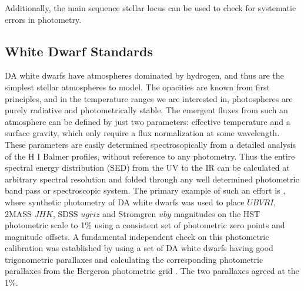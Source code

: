 \documentclass[12pt,preprint]{aastex}
\begin{document}
\noindent
Additionally, the main sequence stellar locus can be used to check for systematic errors in 
photometry.

\subsection{White Dwarf Standards}
\label{sec:WDStandards}

DA white dwarfs have atmospheres dominated by hydrogen, and thus are the simplest stellar atmospheres to model.  The opacities are known from first principles, and in the temperature ranges we are interested in, photospheres are purely radiative and photometrically stable.  The emergent fluxes from such an atmosphere can be defined by just two parameters: effective temperature and a surface gravity, which only require a flux normalization at some wavelength.  These parameters are easily determined spectrosopically from a detailed analysis of the H I Balmer profiles, without reference to any photometry.  Thus the entire spectral energy distribution (SED) from the UV to the IR can be calculated at arbitrary spectral resolution and folded through any well determined photometric band pass or spectroscopic system.  The primary example of such an effort is \cite{Holberg2006}, where synthetic photometry of DA white dwarfs was used to place $UBVRI$, 2MASS $JHK$, SDSS $ugriz$ and Stromgren $uby$ magnitudes on the HST photometric scale to 1\% using a consistent set of photometric zero points and magnitude offsets.    A fundamental independent check on this photometric calibration was established by using a set of DA white dwarfs having good trigonometric parallaxes and calculating the corresponding photometric parallaxes from the Bergeron photometric grid \citep{Holberg2008}.   The two parallaxes agreed at the 1\%. 
\end{document}

